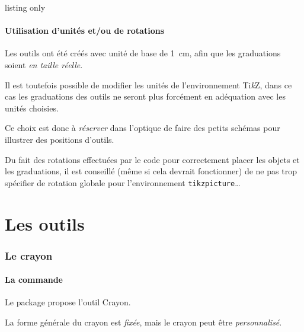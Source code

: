 \documentclass[french,a4paper,11pt]{article}
\providecommand\tikzlogo{Ti\textit{k}Z}
\let\TikZ\tikzlogo
\begin{document}
\begin{PresentationCode}{listing only}
\tkzRegle[clés]
\tkzEquerre[clés]
\tkzRapporteur[clés]
\tkzPourcenteur[clés]
\tkzRequerre[clés]
\tkzRappEquerre[clés]
\tkzRegleRepere[clés]
\tkzCrayon[clés]
\end{PresentationCode}

\subsection{Utilisation d'unités et/ou de rotations}

\begin{tipblock}
Les outils ont été créés avec unité de base de 1~cm, afin que les graduations soient \textit{en taille réelle}.

\smallskip

Il est toutefois possible de modifier les unités de l'environnement \TikZ, dans ce cas les graduations des outils ne seront plus forcément en adéquation avec les unités choisies.

\smallskip

Ce choix est donc à \textit{réserver} dans l'optique de faire des petits schémas pour illustrer des positions d'outils.

\smallskip

Du fait des rotations effectuées par le code pour correctement placer les objets et les graduations, il est conseillé (même si cela devrait fonctionner) de ne pas trop spécifier de rotation globale pour l'environnement \texttt{tikzpicture}\ldots
\end{tipblock}

\pagebreak

\part{Les outils}

\section{Le crayon}

\subsection{La commande}

\begin{cautionblock}
Le package propose l'outil \textsf{Crayon}.

La forme générale du crayon est \textit{fixée}, mais le crayon peut être \textit{personnalisé}.
\end{cautionblock}
\end{document}
